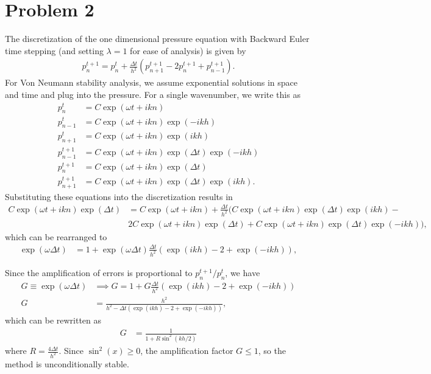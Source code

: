 \documentclass{article}
\begin{document}
\section{Problem 2}
The discretization of the one dimensional pressure equation with Backward Euler time stepping (and setting $\lambda = 1$ for ease of analysis) is given by
\begin{align}
   p_n^{t+1} = p_n^{t} + \frac{\Delta t}{h^2}\left( p_{n+1}^{t+1} - 2p_n^{t+1} + p_{n-1}^{t+1} \right).
    \label{eqn:be-disc}
\end{align}
For Von Neumann stability analysis, we assume exponential solutions in space and time and plug into the pressure. For a single wavenumber, we write this as
\begin{align}
    p^{t}_{n} &= C \exp(\omega t+ikn) \\
    p^{t}_{n-1} &= C \exp(\omega t+ikn) \exp(-ikh) \\
    p^{t}_{n+1} &= C \exp(\omega t+ikn) \exp(ikh)\\
    p^{t+1}_{n-1} &= C \exp(\omega t+ikn) \exp(\Delta t) \exp(-ikh)\\
    p^{t+1}_{n} &= C \exp(\omega t+ikn) \exp(\Delta t)\\
    p^{t+1}_{n+1} &= C \exp(\omega t+ikn) \exp(\Delta t) \exp(ikh).
\end{align}
Substituting these equations into the discretization results in
\begin{align*}
    C \exp(\omega t+ikn) \exp(\Delta t) &= C \exp(\omega t+ikn) + \frac{\Delta t}{h^2} (C \exp(\omega t+ikn) \exp(\Delta t) \exp(ikh) - \\
                                & 2 C \exp(\omega t+ikn) \exp(\Delta t) + C \exp(\omega t+ikn) \exp(\Delta t) \exp(-ikh)),
\end{align*}
which can be rearranged to
\begin{align}
    \exp(\omega \Delta t) &= 1 + \exp(\omega \Delta t) \frac{\Delta t}{h^2} \left( \exp(ikh) - 2 + \exp(-ikh) \right),
\end{align}

Since the amplification of errors is proportional to $p^{t+1}_{n} / p^{t}_{n}$, we have
\begin{align}
    G \equiv \exp(\omega \Delta t) &\implies G = 1 + G \frac{\Delta t}{h^2} \left( \exp(ikh) - 2 + \exp(-ikh) \right) \\
    G &= \frac{h^2} {h^2 - \Delta t \left( \exp(ikh) - 2 + \exp(-ikh) \right)},
\end{align}
which can be rewritten as
\begin{align}
    G &= \frac{1} {1 + R \sin^2 (kh/2)}
\end{align}
where $R = \frac{4 \Delta t}{h^2}$. Since $\sin^2(x) \ge 0$, the amplification factor $G \le 1$, so the method is unconditionally stable.
\end{document}
